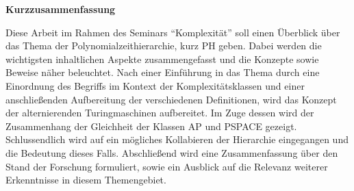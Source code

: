 \newpage

\vspace*{1cm}

\begin{center}
    \textbf{Kurzzusammenfassung}
\end{center}

\vspace*{1cm}

\noindent 
Diese Arbeit im Rahmen des Seminars \enquote{Komplexität} soll einen Überblick über das Thema der Polynomialzeithierarchie, kurz PH geben. Dabei werden die wichtigsten inhaltlichen Aspekte zusammengefasst
und die Konzepte sowie Beweise näher beleuchtet. Nach einer Einführung in das Thema durch eine Einordnung des Begriffs im Kontext der Komplexitätsklassen und einer anschließenden Aufbereitung der 
verschiedenen Definitionen, wird das Konzept der alternierenden Turingmaschinen aufbereitet. Im Zuge dessen wird der Zusammenhang der Gleichheit der Klassen AP und PSPACE gezeigt. Schlussendlich 
wird auf ein mögliches Kollabieren der Hierarchie eingegangen und die Bedeutung dieses Falls. Abschließend wird eine Zusammenfassung über den Stand der Forschung formuliert, sowie ein Ausblick auf die Relevanz
weiterer Erkenntnisse in diesem Themengebiet.